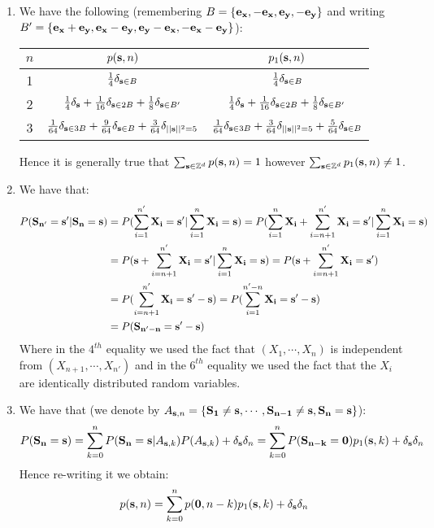 \documentclass[10pt,a4paper]{article}
\begin{document}
\begin{enumerate}
\item We have the following (remembering $B = \{\vb{e_x}, -\vb{e_x}, \vb{e_y}, -\vb{e_y}\}$ and writing $B' = \{\vb{e_x} + \vb{e_y}, \vb{e_x} - \vb{e_y}, \vb{e_y} - \vb{e_x}, -\vb{e_x} - \vb{e_y}\}$):
\begin{center}
\begin{tabular}{c | c | c |}
$n$ & $p(\vb{s}, n)$ & $p_1(\vb{s}, n)$\\
\hline
1 & $\frac{1}{4}\delta_{\vb{s} \in B}$ & $\frac{1}{4} \delta_{\vb{s} \in B}$ \\
\hline
2 & $\frac{1}{4} \delta_{\vb{s}} + \frac{1}{16} \delta_{\vb{s} \in 2 B} + \frac{1}{8} \delta_{\vb{s} \in B'}$ & $\frac{1}{4} \delta_{\vb{s}} + \frac{1}{16} \delta_{\vb{s} \in 2B} + \frac{1}{8} \delta_{\vb{s} \in B'}$ \\
\hline
3 & $ \frac{1}{64} \delta_{\vb{s} \in 3 B} + \frac{9}{64} \delta_{\vb{s} \in B} + \frac{3}{64} \delta_{||\vb{s}||^2 = 5} $ & $\frac{1}{64} \delta_{\vb{s} \in 3B} + \frac{3}{64} \delta_{||\vb{s}||^2 =  5} + \frac{5}{64} \delta_{\vb{s} \in B}$  
\end{tabular}
\end{center}
Hence it is generally true that $\sum_{\vb{s} \in \mathbb{Z}^d} p(\vb{s}, n) = 1$ however $\sum_{\vb{s} \in \mathbb{Z}^d} p_1(\vb{s}, n) \neq 1$. 

\item We have that:
\begin{align*}
P(\vb{S_{n'}} = \vb{s'} | \vb{S_n} = \vb{s}) &= P(\sum_{i = 1}^{n'} \vb{X_i} = \vb{s'} | \sum_{i = 1}^n \vb{X_i} = \vb{s}) = P(\sum_{i = 1}^{n} \vb{X_i} + \sum_{i = n +1}^{n'} \vb{X_i} = \vb{s'} | \sum_{i = 1}^n \vb{X_i} = \vb{s})\\
&= P(\vb{s} + \sum_{i = n+1}^{n'} \vb{X_i} = \vb{s'} | \sum_{i = 1}^n \vb{X_i} = \vb{s}) = P(\vb{s} + \sum_{i = n+1}^{n'} \vb{X_i} = \vb{s'} )\\
&= P(\sum_{i = n+1}^{n'} \vb{X_i} = \vb{s'} - \vb{s}) = P(\sum_{i = 1}^{n' - n} \vb{X_i} = \vb{s'} - \vb{s})\\
&= P(\vb{S_{n' - n}} = \vb{s'} - \vb{s})
\end{align*}
Where in the $4^{th}$ equality we used the fact that $(X_1, \cdots, X_n)$ is independent from $(X_{n+1}, \cdots, X_{n'})$ and in the $6^{th}$ equality we used the fact that the $X_i$ are identically distributed random variables. 

\item We have that (we denote by $A_{\vb{s}, n} = \{\vb{S_1} \neq \vb{s}, \cdots, \vb{S_{n-1}} \neq \vb{s}, \vb{S_n} = \vb{s}\}$):
\[
P(\vb{S_n} = \vb{s}) = \sum_{k = 0}^n P(\vb{S_n} = \vb{s} | A_{\vb{s}, k}) P(A_{\vb{s}, k}) + \delta_{\vb{s}} \delta_n = \sum_{k = 0}^n P(\vb{S_{n - k}} = \vb{0}) p_1(\vb{s}, k) + \delta_{\vb{s}} \delta_n
\]
Hence re-writing it we obtain:
\[
p(\vb{s}, n) = \sum_{k = 0}^n p(\vb{0}, n - k) p_1(\vb{s}, k) + \delta_{\vb{s}} \delta_n
\]


\end{enumerate}
\end{document}

